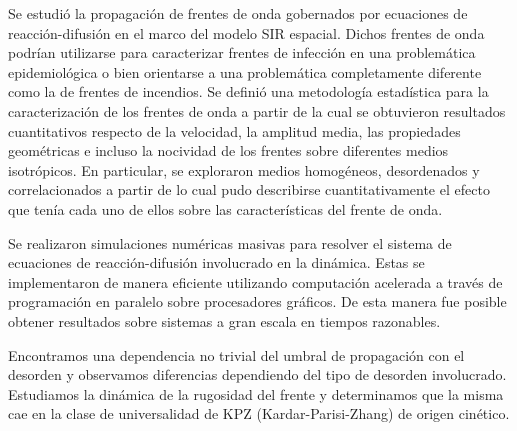 \begin{resumen}
    Se estudió la propagación de frentes de onda gobernados por ecuaciones de reacción-difusión en el marco del modelo SIR espacial.
    Dichos frentes de onda podrían utilizarse para caracterizar frentes de infección en una problemática epidemiológica o bien orientarse a una problemática completamente
    diferente como la de frentes de incendios. Se definió una metodología estadística para la caracterización de los frentes de onda a partir de la cual se obtuvieron
    resultados cuantitativos respecto de la velocidad, la amplitud media, las propiedades geométricas e incluso la nocividad de los frentes sobre diferentes medios
    isotrópicos. En particular, se exploraron medios homogéneos, desordenados y correlacionados a partir de lo cual pudo describirse cuantitativamente el efecto que tenía
    cada uno de ellos sobre las características del frente de onda.
     
    Se realizaron simulaciones numéricas masivas para resolver el sistema de ecuaciones de reacción-difusión involucrado en la dinámica. Estas se implementaron
    de manera eficiente utilizando computación acelerada a través de programación en paralelo sobre procesadores gráficos. De esta manera fue posible obtener resultados
    sobre sistemas a gran escala en tiempos razonables.

    Encontramos una dependencia no trivial del umbral de propagación con el desorden y observamos diferencias dependiendo del tipo de desorden involucrado. 
    Estudiamos la dinámica de la rugosidad del frente y determinamos que la misma cae en la clase de universalidad de KPZ (Kardar-Parisi-Zhang) de origen cinético.
\end{resumen}

